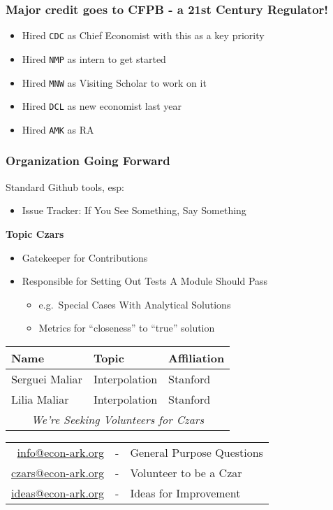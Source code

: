 \documentclass[public]{beamer}
\providecommand{\CDC}{\texttt{CDC}}
\providecommand{\NMP}{\texttt{NMP}}
\providecommand{\MNW}{\texttt{MNW}}
\providecommand{\DCL}{\texttt{DCL}}
\providecommand{\AMK}{\texttt{AMK}}
\begin{document}
\begin{frame}
\frametitle{Major credit goes to CFPB - a 21st Century Regulator!}

\begin{itemize}
\item Hired {\CDC} as Chief Economist with this as a key priority
\item Hired {\NMP} as intern to get started
\item Hired {\MNW} as Visiting Scholar to work on it
\item Hired {\DCL} as new economist last year
\item Hired {\AMK} as RA
\end{itemize}
\end{frame}


\begin{frame}
\frametitle{Organization Going Forward}

Standard Github tools, esp:
\begin{itemize}
\item Issue Tracker: If You See Something, Say Something
\end{itemize}
\begin{center}
{\bf Topic Czars}

\begin{itemize}
\item Gatekeeper for Contributions
\item Responsible for Setting Out Tests A Module Should Pass
\begin{itemize}
\item e.g.\ Special Cases With Analytical Solutions
\item Metrics for ``closeness'' to ``true'' solution
\end{itemize}
\end{itemize}

\pause 
\begin{tabular}{lll}
Name & Topic & Affiliation
\\ \hline  Serguei Maliar & Interpolation & Stanford %
\\ Lilia Maliar & Interpolation & Stanford %
\\  \multicolumn{3}{c}{{\it We're Seeking Volunteers for Czars}}
\end{tabular}
\end{center}

\pause
\begin{tabular}{rcl}
\hline \href{mailto:info@econ-ark.org}{info@econ-ark.org} & - & General Purpose Questions
\\ \href{mailto:czars@econ-ark.org}{czars@econ-ark.org} & - & Volunteer to be a Czar
\\ \href{mailto:ideas@econ-ark.org}{ideas@econ-ark.org} & - & Ideas for Improvement
\end{tabular}


\end{frame}
\end{document}
